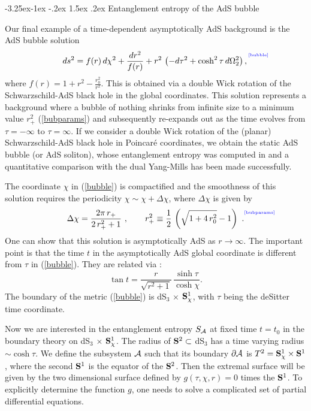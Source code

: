 \documentclass[12pt]{article}
\makeatletter
\renewcommand\subsection{\@startsection{subsection}{2}{\z@}%
                                     {-3.25ex\@plus -1ex \@minus -.2ex}%
                                     {1.5ex \@plus .2ex}%
                                     {\normalfont\bfseries}}
\newcommand{\be}{\begin{equation}}
\newcommand{\ee}{\end{equation}}
\def\req#1{(\ref{#1})}
\def\({\left (}
\def\){\right )}
\def\p{\partial}
\def\s{\sigma}
\def\CA{{\cal A}}
\def\Sp{{\bf S}}
\def\p{\partial}
\def\f#1#2{{\frac{#1}{#2}}}
\def\f#1#2{{\frac{#1}{#2}}}
\def\p{\partial}
\def\Label#1{\label{#1}%
{ \color{blue}{\smash{\hbox to0pt{\raise2ex\hbox{\tiny[#1]}\hss}}}}}
\def\rA{\CA}
\def\brA{\p \CA}
\def\s{\sqrt}
\def\f {\frac}
\makeatother
\begin{document}
\subsection{Entanglement entropy of the AdS bubble}

Our final example of a time-dependent asymptotically AdS background
is the AdS bubble solution \cite{Birmingham:2002st,
Balasubramanian:2002am}
%
\begin{equation}
ds^2=f(r) \, d\chi^2+\f{dr^2}{f(r)}+r^2 \, \(-d\tau^2+\cosh^2 \tau
\, d\Omega_2^2\), \Label{bubble}
\end{equation}
%
where $f(r)=1+ r^2-\f{r_0^2}{r^2}$. This is obtained via a double
Wick rotation of the Schwarzschild-AdS black hole in the global
coordinates. This solution represents a background where a bubble of
nothing shrinks from infinite size to a minimum value $r_+^2$
\req{bubparams} and subsequently re-expands out as the time evolves
from $\tau=-\infty$ to $\tau=\infty$. If we consider a double Wick
rotation of the  (planar) Schwarzschild-AdS black hole in Poincar\'e
coordinates, we obtain the static AdS bubble (or AdS soliton), whose
entanglement entropy was computed in \cite{Nishioka:2006gr} and a
quantitative comparison with the dual Yang-Mills has been made
successfully.

The coordinate $\chi$ in \req{bubble} is compactified and the
smoothness of this solution requires the periodicity $\chi\sim
\chi+\Delta\chi$, where $\Delta\chi$ is given by
%
\be
\Delta\chi=\f{2\pi \, r_+}{2\,r_+^2+1 } \ , \qquad
r^2_+\equiv
\f{1}{2}\, \left(\s{1+4\, r_0^2}-1\right) \ .
\Label{bubparams}
 \ee
%
One can show that this solution is asymptotically AdS as
$r\to\infty$. The important point is that the time $t$ in the
asymptotically AdS global coordinate is different from $\tau$ in
\req{bubble}. They are related via \cite{Balasubramanian:2002am}:
%
 \be \tan t=\f{r}{\s{r^2+1}}\, \f{\sinh \tau}{\cosh \chi}.
\ee
%
The boundary of the metric \req{bubble} is dS$_3$ $\times$ $\Sp^1_\chi$,
with $\tau$ being the deSitter time coordinate.

Now we are interested in the entanglement entropy $S_{\rA}$ at fixed
time $t=t_0$ in the boundary theory on dS$_3$ $\times$ $\Sp^1_\chi$.
The radius of $\Sp^2 \subset$ dS$_3$ has a time varying radius
$\sim\cosh \tau$. We define the subsystem $\rA$ such that its
boundary $\brA$ is $T^2=\Sp^1_{\chi}\times \Sp^1$, where the second
$\Sp^1$ is the equator of the $\Sp^2$. Then the extremal surface
will be given by the two dimensional surface defined by
$g(\tau,\chi,r)=0$ times the $\Sp^1$.  To explicitly determine the
function $g$, one needs  to solve a complicated set of partial
differential equations.
\end{document}
